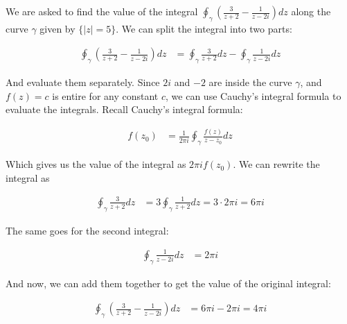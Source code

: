 We are asked to find the value of the integral
$\oint_{\gamma}\left(\frac{3}{z+2}-\frac{1}{z-2i}\right)dz$ along the curve
$\gamma$ given by $\{|z|=5\}$. We can split the integral into two parts:

\begin{align*}
    \oint_{\gamma}\left(\frac{3}{z+2}-\frac{1}{z-2i}\right)dz & =
    \oint_{\gamma}\frac{3}{z+2}dz - \oint_{\gamma}\frac{1}{z-2i}dz
\end{align*}

And evaluate them separately. Since $2i$ and $-2$ are inside the curve
$\gamma$, and $f(z) = c$ is entire for any constant $c$, we can use Cauchy's
integral formula to evaluate the integrals. Recall Cauchy's integral formula:

\begin{align*}
    f(z_0) & = \frac{1}{2\pi i}\oint_{\gamma}\frac{f(z)}{z-z_0}dz
\end{align*}

Which gives us the value of the integral as $2\pi i f(z_0)$. We can rewrite the integral as

\begin{align*}
    \oint_{\gamma}\frac{3}{z+2}dz & = 3\oint_{\gamma}\frac{1}{z+2}dz = 3\cdot 2\pi i = 6\pi i
\end{align*}

The same goes for the second integral:

\begin{align*}
    \oint_{\gamma}\frac{1}{z-2i}dz & = 2\pi i
\end{align*}

And now, we can add them together to get the value of the original integral:

\begin{align*}
    \oint_{\gamma}\left(\frac{3}{z+2}-\frac{1}{z-2i}\right)dz & = 6\pi i - 2\pi i = 4\pi i
\end{align*}